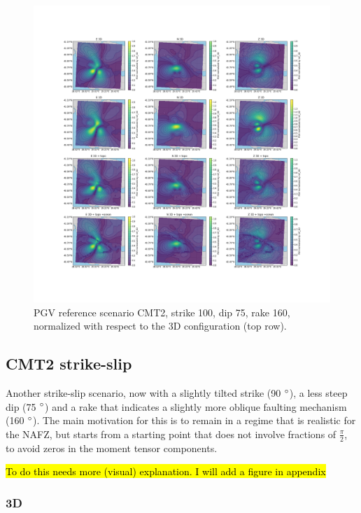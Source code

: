 \documentclass[../Text/00main.tex]{subfiles}
\begin{document}
\begin{figure}[htp!]
    \centering
    \includegraphics[width=1.2\linewidth]{images_results/Ref_scenarios_normalized_sc2.png}
    \caption{PGV reference scenario CMT2, strike 100, dip 75, rake 160, normalized with respect to the 3D configuration (top row).}
    \label{fig:ref_CMT2}
\end{figure}

\subsection{CMT2 strike-slip}

Another strike-slip scenario, now with a slightly tilted strike (90 $\degree$), a less steep dip (75 $\degree$) and a rake that indicates a slightly more oblique faulting mechanism (160 $\degree$). The main motivation for this is to remain in a regime that is realistic for the NAFZ, but starts from a starting point that does not involve fractions of $\frac{\pi}{2}$, to avoid zeros in the moment tensor components. 

\hl{To do this needs more (visual) explanation. I will add a figure in appendix}

\subsubsection{3D}
\end{document}
